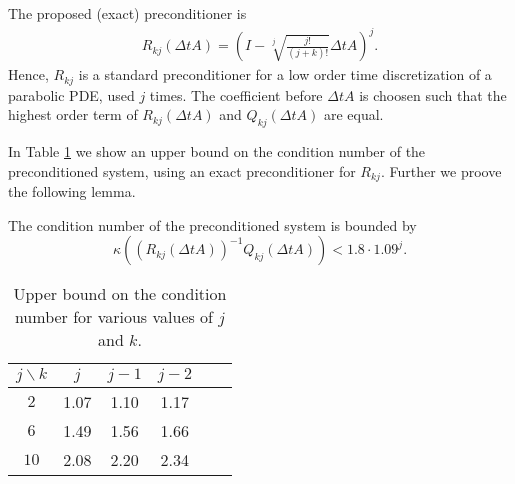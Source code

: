 \documentclass{report}
\begin{document}
The proposed (exact) preconditioner is
\begin{eqnarray*}
R_{kj} (\Delta t A) =\left( I- \sqrt[j]{\frac {j!}{(j+k)!}}\Delta t A \right)^j.
\end{eqnarray*}
Hence, $R_{kj}$ is a standard preconditioner for a low
order time discretization of a parabolic PDE, used
$j$ times.
The coefficient before $\Delta t A$ is choosen such that the
highest order term of $R_{kj}(\Delta t A)$
and $Q_{kj} (\Delta t A)$ are equal.

In Table \ref{cond} we show an upper bound on the condition
number of the preconditioned system, using an exact preconditioner
for $R_{kj}$. Further we proove the following lemma.

\begin{lemma}
The condition number of
the preconditioned system is bounded by
\begin{equation*}
\kappa \left( \left( R_{kj}(\Delta t A) \right)^{-1} Q_{kj}(\Delta t
A) \right) < 1.8 \cdot 1.09^j.
\end{equation*}
\end{lemma}

\begin{table}
\begin{center}
\begin{tabular}{|c|c|c|c|c|c|}
\hline
$j\backslash k$& $j$ & $j-1$ & $j-2$ \\ \hline
$2$ & 1.07 & 1.10 & 1.17 \\ \hline
$6$ & 1.49 & 1.56 & 1.66 \\ \hline
$10$ & 2.08 & 2.20 & 2.34 \\ \hline
\end{tabular}
\end{center}
\caption{Upper bound on the condition number for various values of $j$ and $k$.}
\label{cond}
\end{table}
\end{document}
